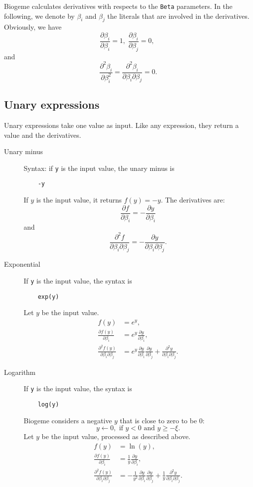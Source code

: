\documentclass[12pt,a4paper]{article}
\begin{document}
Biogeme calculates derivatives with respects to the \lstinline+Beta+ parameters. In the following, we denote by $\beta_i$ and $\beta_j$ the literals that are involved in the derivatives.
Obviously, we have
\[
\frac{\partial \beta_i}{\partial \beta_i}=1, \;
\frac{\partial \beta_i}{\partial \beta_j}=0, \;
\]
and
\[
\frac{\partial^2 \beta_i}{\partial \beta_i^2}=\frac{\partial^2 \beta_i}{\partial \beta_i \partial \beta_j} = 0. 
\]


\subsection{Unary expressions}

Unary expressions take one value as input. Like any expression, they return a value and the derivatives.
\begin{description}
\item[Unary minus]
  Syntax: if \lstinline+y+ is the input value, the unary minus is
  \begin{lstlisting}
    -y
  \end{lstlisting}
  If $y$ is the input value, it returns $f(y)=-y$. 
  The derivatives are:
  \[
  \frac{\partial f}{\partial \beta_i} = - \frac{\partial y}{\partial \beta_i}
  \]
  and
  \[
  \frac{\partial^2 f}{\partial \beta_i \partial \beta_j} = - \frac{\partial y}{\partial \beta_i \partial \beta_j}.
  \]
\item[Exponential] If \lstinline+y+ is the input value, the syntax is
  \begin{lstlisting}
    exp(y)
  \end{lstlisting}
  Let $y$ be the input value.
  \begin{align*}
    f(y)&= e^y, \\
    \frac{\partial f(y)}{\partial \beta_i} &= e^y \frac{\partial y}{\partial \beta_i}, \\
    \frac{\partial^2 f(y)}{\partial \beta_i \partial \beta_j} &= e^y \frac{\partial y}{\partial \beta_i}\frac{\partial y}{\partial \beta_j} + \frac{\partial^2 y}{\partial \beta_i \partial \beta_j}.
  \end{align*}

\item[Logarithm] If \lstinline+y+ is the input value, the syntax is
  \begin{lstlisting}
    log(y)
  \end{lstlisting}
  
  Biogeme considers a negative $y$ that is close to zero to be 0:
  \[
  y \leftarrow 0, \text{ if } y < 0 \text{ and } y \geq -\xi.
  \]
  Let $y$ be the input value, processed as described above.
    \begin{align*}
    f(y)& =\ln(y), \\ 
    \frac{\partial f(y)}{\partial \beta_i} &= \frac{1}{y} \frac{\partial y}{\partial \beta_i}, \\
    \frac{\partial^2 f(y)}{\partial \beta_i \partial \beta_j} &=
    -\frac{1}{y^{2}}
    \frac{\partial y}{\partial \beta_i}
    \frac{\partial y}{\partial \beta_j }
    + \frac{1}{y}
    \frac{\partial^2 y}{\partial \beta_i \partial \beta_j}.
    \end{align*}



\end{description}
\end{document}
